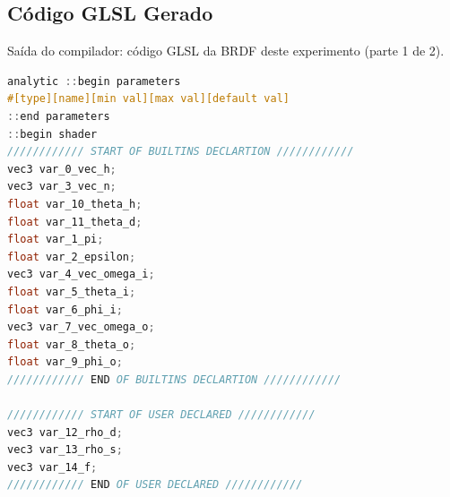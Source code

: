\subsection{Código GLSL Gerado}
\begin{codigo}[H]
    \caption{\small Saída do compilador: código GLSL da BRDF deste experimento (parte 1 de 2).}
    \label{cod-ashikhmin-shirley-alternative-glsl-pt-1}
\begin{lstlisting}[language=C, inputencoding=utf8]
analytic ::begin parameters
#[type][name][min val][max val][default val]
::end parameters
::begin shader
//////////// START OF BUILTINS DECLARTION ////////////
vec3 var_0_vec_h;
vec3 var_3_vec_n;
float var_10_theta_h;
float var_11_theta_d;
float var_1_pi;
float var_2_epsilon;
vec3 var_4_vec_omega_i;
float var_5_theta_i;
float var_6_phi_i;
vec3 var_7_vec_omega_o;
float var_8_theta_o;
float var_9_phi_o;
//////////// END OF BUILTINS DECLARTION ////////////

//////////// START OF USER DECLARED ////////////
vec3 var_12_rho_d;
vec3 var_13_rho_s;
vec3 var_14_f;
//////////// END OF USER DECLARED ////////////
\end{lstlisting}
\end{codigo}


